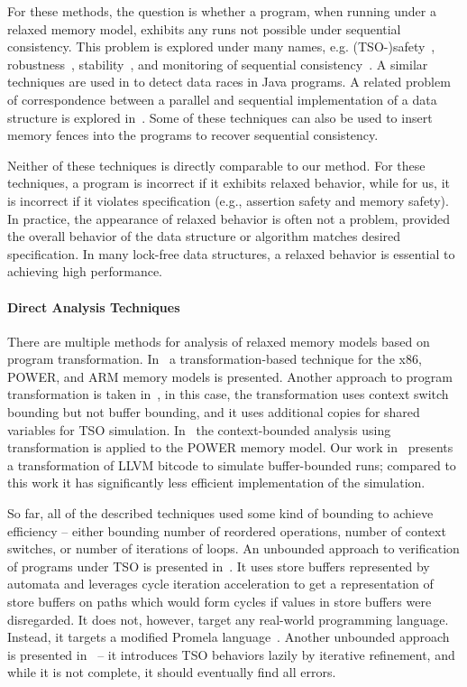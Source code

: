 For these methods, the question is whether a program, when running under a relaxed memory model, exhibits any runs not possible under sequential consistency.
This problem is explored under many names, e.g. (TSO-)safety~\cite{Burckhardt2008}, robustness~\cite{Bouajjani2013,Derevenetc2014}, stability~\cite{Alglave2011}, and monitoring of sequential consistency~\cite{Burnim2011}.
A similar techniques are used in \cite{Yang2004} to detect data races in Java programs.
A related problem of correspondence between a parallel and sequential implementation of a data structure is explored in~\cite{Ou2017}.
Some of these techniques can also be used to insert memory fences into the programs to recover sequential consistency.

Neither of these techniques is directly comparable to our method.
For these techniques, a program is incorrect if it exhibits relaxed behavior, while for us, it is incorrect if it violates specification (e.g., assertion safety and memory safety).
In practice, the appearance of relaxed behavior is often not a problem, provided the overall behavior of the data structure or algorithm matches desired specification.
In many lock-free data structures, a relaxed behavior is essential to achieving high performance.

\paragraph{Direct Analysis Techniques}

There are multiple methods for analysis of relaxed memory models based on program transformation.
In~\cite{Alglave2013} a transformation-based technique for the x86, POWER, and ARM memory models is presented.
Another approach to program transformation is taken in~\cite{Atig2011}, in this case, the transformation uses context switch bounding but not buffer bounding, and it uses additional copies for shared variables for TSO simulation.
In~\cite{Abdulla2017} the context-bounded analysis using transformation is applied to the POWER memory model.
Our work in~\cite{SRB15weakmem} presents a transformation of LLVM bitcode to simulate buffer-bounded \xtso runs; compared to this work it has significantly less efficient implementation of the \xtso simulation.


So far, all of the described techniques used some kind of bounding to achieve efficiency -- either bounding number of reordered operations, number of context switches, or number of iterations of loops.
An unbounded approach to verification of programs under TSO is presented in~\cite{Linden2010}.
It uses store buffers represented by automata and leverages cycle iteration acceleration to get a representation of store buffers on paths which would form cycles if values in store buffers were disregarded.
It does not, however, target any real-world programming language.
Instead, it targets a modified Promela language~\cite{Holzmann1997}.
Another unbounded approach is presented in~\cite{Bouajjani2015} -- it introduces TSO behaviors lazily by iterative refinement, and while it is not complete, it should eventually find all errors.

